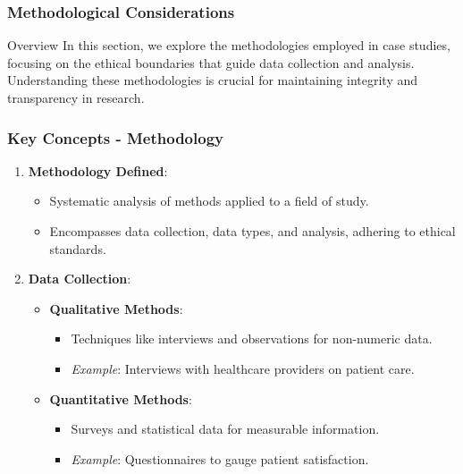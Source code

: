 \documentclass{beamer}
\begin{document}
\begin{frame}[fragile]
    \frametitle{Methodological Considerations}

    \begin{block}{Overview}
        In this section, we explore the methodologies employed in case studies, focusing on the ethical boundaries that guide data collection and analysis. 
        Understanding these methodologies is crucial for maintaining integrity and transparency in research.
    \end{block}
\end{frame}

\begin{frame}[fragile]
    \frametitle{Key Concepts - Methodology}

    \begin{enumerate}
        \item \textbf{Methodology Defined}:
            \begin{itemize}
                \item Systematic analysis of methods applied to a field of study.
                \item Encompasses data collection, data types, and analysis, adhering to ethical standards.
            \end{itemize}

        \item \textbf{Data Collection}:
            \begin{itemize}
                \item \textbf{Qualitative Methods}:
                    \begin{itemize}
                        \item Techniques like interviews and observations for non-numeric data.
                        \item \textit{Example}: Interviews with healthcare providers on patient care.
                    \end{itemize}
                \item \textbf{Quantitative Methods}:
                    \begin{itemize}
                        \item Surveys and statistical data for measurable information.
                        \item \textit{Example}: Questionnaires to gauge patient satisfaction.
                    \end{itemize}
            \end{itemize}
    \end{enumerate}
\end{frame}
\end{document}
